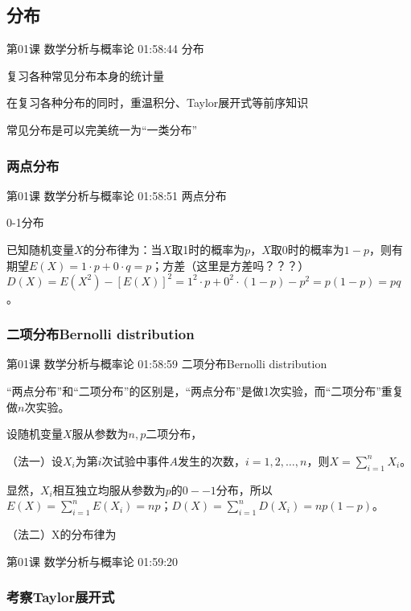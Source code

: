 \documentclass[UTF8]{ctexbook}
\begin{document}





\subsection{分布}

第01课 数学分析与概率论 01:58:44 分布

复习各种常见分布本身的统计量

在复习各种分布的同时，重温积分、Taylor展开式等前序知识

常见分布是可以完美统一为“一类分布”

\subsubsection{两点分布}

第01课 数学分析与概率论 01:58:51 两点分布

0-1分布

已知随机变量$X$的分布律为：当$X$取1时的概率为$p$，$X$取0时的概率为$1-p$，则有期望$E(X)=1\cdot p + 0 \cdot q = p$；方差（这里是方差吗？？？）$D(X)=E(X^{2})-[E(X)]^{2}=1^{2} \cdot p + 0^{2} \cdot (1-p) - p^{2} =p(1-p)= pq$。

\subsubsection{二项分布Bernolli distribution}

第01课 数学分析与概率论 01:58:59 二项分布Bernolli distribution

“两点分布”和“二项分布”的区别是，“两点分布”是做1次实验，而“二项分布”重复做$n$次实验。

设随机变量$X$服从参数为$n,p$二项分布，

（法一）设$X_{i}$为第$i$次试验中事件$A$发生的次数，$i=1,2,\dots,n$，则$X=\sum_{i=1}^{n}X_{i}$。

显然，$X_{i}$相互独立均服从参数为$p$的$0--1$分布，所以$E(X)=\sum_{i=1}^{n}E(X_{i})=np$；$D(X)=\sum_{i=1}^{n}D(X_{i})=np(1-p)$。

（法二）X的分布律为

第01课 数学分析与概率论 01:59:20

\subsubsection{考察Taylor展开式}
\end{document}
